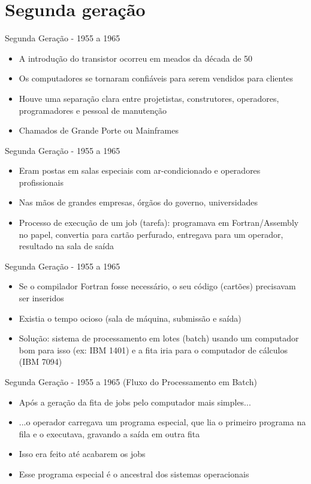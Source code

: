 \documentclass{beamer}
\begin{document}
  \section{Segunda geração}
  \begin{frame}{Segunda Geração - 1955 a 1965}
      \begin{itemize}
          \item A introdução do transistor ocorreu em meados da década de 50
          \item Os computadores se tornaram confiáveis para serem vendidos para clientes
          \item Houve uma separação clara entre projetistas, construtores, operadores, programadores e pessoal de manutenção
          \item Chamados de Grande Porte ou Mainframes
      \end{itemize}
  \end{frame}
  \begin{frame}{Segunda Geração - 1955 a 1965}
      \begin{itemize}
          \item Eram postas em salas especiais com ar-condicionado e operadores profissionais
          \item Nas mãos de grandes empresas, órgãos do governo, universidades
          \item Processo de execução de um job (tarefa):
                programava em Fortran/Assembly no papel,
                convertia para cartão perfurado, entregava para um operador, resultado na sala de saída
      \end{itemize}
  \end{frame}
  \begin{frame}{Segunda Geração - 1955 a 1965}
      \begin{itemize}
          \item Se o compilador Fortran fosse necessário, o seu código (cartões) precisavam ser inseridos
          \item Existia o tempo ocioso (sala de máquina, submissão e saída)
          \item Solução: sistema de processamento em lotes (batch) usando um computador bom para isso (ex: IBM 1401) e a fita iria para o computador de cálculos (IBM 7094)
      \end{itemize}
  \end{frame}
  \begin{frame}{Segunda Geração - 1955 a 1965 (Fluxo do Processamento em Batch)}
      \begin{itemize}
          \item Após a geração da fita de jobs pelo computador mais simples...
          \item ...o operador carregava um programa especial, que lia o primeiro programa na fila e o executava, gravando a saída em outra fita
          \item Isso era feito até acabarem os jobs
          \item Esse programa especial é o ancestral dos sistemas operacionais
      \end{itemize}
  \end{frame}
\end{document}

